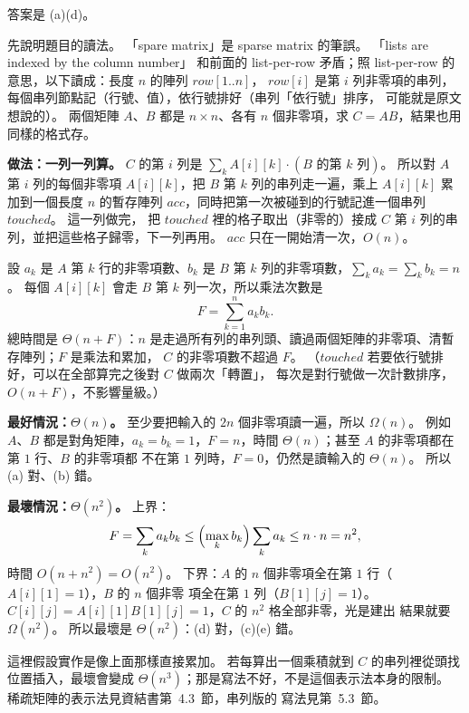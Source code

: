 \begin{pastsoln}
答案是 (a)(d)。

先說明題目的讀法。 「spare matrix」是 sparse matrix 的筆誤。 「lists are indexed by the column number」
和前面的 list-per-row 矛盾；照 list-per-row 的意思，以下讀成：長度 $n$ 的陣列 $\mathit{row}[1..n]$，
$\mathit{row}[i]$ 是第 $i$ 列非零項的串列，每個串列節點記（行號、值），依行號排好（串列「依行號」排序，
可能就是原文想說的）。 兩個矩陣 $A$、$B$ 都是 $n \times n$、各有 $n$ 個非零項，求 $C = AB$，結果也用
同樣的格式存。

\textbf{做法：一列一列算。} $C$ 的第 $i$ 列是 $\sum_{k} A[i][k] \cdot (B \text{ 的第 } k \text{ 列})$。
所以對 $A$ 第 $i$ 列的每個非零項 $A[i][k]$，把 $B$ 第 $k$ 列的串列走一遍，乘上 $A[i][k]$ 累加到一個長度
$n$ 的暫存陣列 $\mathit{acc}$，同時把第一次被碰到的行號記進一個串列 $\mathit{touched}$。 這一列做完，
把 $\mathit{touched}$ 裡的格子取出（非零的）接成 $C$ 第 $i$ 列的串列，並把這些格子歸零，下一列再用。
$\mathit{acc}$ 只在一開始清一次，$O(n)$。

設 $a_k$ 是 $A$ 第 $k$ 行的非零項數、$b_k$ 是 $B$ 第 $k$ 列的非零項數，$\sum_k a_k = \sum_k b_k = n$。
每個 $A[i][k]$ 會走 $B$ 第 $k$ 列一次，所以乘法次數是
\[
F = \sum_{k=1}^{n} a_k b_k .
\]
總時間是 $\Theta(n + F)$：$n$ 是走過所有列的串列頭、讀過兩個矩陣的非零項、清暫存陣列；$F$ 是乘法和累加，
$C$ 的非零項數不超過 $F$。 （$\mathit{touched}$ 若要依行號排好，可以在全部算完之後對 $C$ 做兩次「轉置」，
每次是對行號做一次計數排序，$O(n + F)$，不影響量級。）

\textbf{最好情況：$\Theta(n)$。} 至少要把輸入的 $2n$ 個非零項讀一遍，所以 $\Omega(n)$。 例如 $A$、$B$
都是對角矩陣，$a_k = b_k = 1$，$F = n$，時間 $\Theta(n)$；甚至 $A$ 的非零項都在第 $1$ 行、$B$ 的非零項都
不在第 $1$ 列時，$F = 0$，仍然是讀輸入的 $\Theta(n)$。 所以 (a) 對、(b) 錯。

\textbf{最壞情況：$\Theta(n^2)$。} 上界：
\[
F = \sum_k a_k b_k \le \Bigl(\max_k b_k\Bigr) \sum_k a_k \le n \cdot n = n^2 ,
\]
時間 $O(n + n^2) = O(n^2)$。 下界：$A$ 的 $n$ 個非零項全在第 $1$ 行（$A[i][1] = 1$），$B$ 的 $n$ 個非零
項全在第 $1$ 列（$B[1][j] = 1$）。 $C[i][j] = A[i][1] B[1][j] = 1$，$C$ 的 $n^2$ 格全部非零，光是建出
結果就要 $\Omega(n^2)$。 所以最壞是 $\Theta(n^2)$：(d) 對，(c)(e) 錯。

這裡假設實作是像上面那樣直接累加。 若每算出一個乘積就到 $C$ 的串列裡從頭找位置插入，最壞會變成
$\Theta(n^3)$；那是寫法不好，不是這個表示法本身的限制。 稀疏矩陣的表示法見資結書第~4.3~節，串列版的
寫法見第~5.3~節。
\end{pastsoln}
